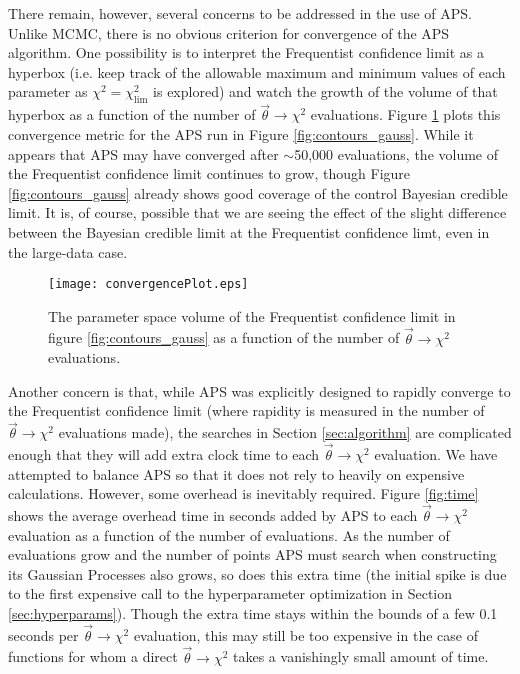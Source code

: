 \documentclass[useAMS,usenatbib]{aastex}
\begin{document}
There remain, however, several concerns to be addressed in the use of APS.  Unlike MCMC, there is
no obvious criterion for convergence of the APS algorithm.  One possibility is to interpret the Frequentist
confidence limit as a hyperbox (i.e. keep track of the allowable maximum and minimum values of each parameter
as $\chi^2=\chi^2_\text{lim}$ is explored) and watch the growth of the volume of that hyperbox as a function
of the number of $\vec{\theta}\rightarrow\chi^2$ evaluations.  Figure \ref{fig:convergence} plots this
convergence metric for the APS run in Figure \ref{fig:contours_gauss}.  While it appears that APS may have
converged after $\sim$50,000 evaluations, the volume of the Frequentist confidence limit continues to grow,
though Figure \ref{fig:contours_gauss} already shows good coverage of the control Bayesian credible limit. 
It is, of course, possible that we are seeing the effect of the slight difference between the Bayesian
credible limit at the Frequentist confidence limt, even in the large-data case.

\begin{figure}
\texttt{[image: convergencePlot.eps]}
\caption{
The parameter space volume of the Frequentist confidence limit
in figure \ref{fig:contours_gauss} as a function of the number of
$\vec{\theta}\rightarrow\chi^2$ evaluations.
}
\label{fig:convergence}
\end{figure}

Another concern is that, while APS was explicitly designed to rapidly converge
to the Frequentist confidence limit (where rapidity is measured in the number of
$\vec{\theta}\rightarrow\chi^2$ evaluations made), the searches in Section \ref{sec:algorithm}
are complicated enough that they will add extra clock time to each $\vec{\theta}\rightarrow\chi^2$
evaluation.  We have attempted to balance APS so that it does not rely to heavily on expensive calculations.
However, some overhead is inevitably required.  Figure \ref{fig:time} shows the average overhead
time in seconds added by APS to each $\vec{\theta}\rightarrow\chi^2$ evaluation as a function
of the number of evaluations.  As the number of evaluations grow and the number of points APS must search
when constructing its Gaussian Processes also grows, so does this extra time (the initial spike is due to the
first expensive call to the hyperparameter optimization in Section \ref{sec:hyperparams}).
Though the extra time stays within the bounds of a few 0.1 seconds per $\vec{\theta}\rightarrow\chi^2$
evaluation, this may still be too expensive in the case of functions for whom a direct
$\vec{\theta}\rightarrow\chi^2$ takes a vanishingly small amount of time.
\end{document}
